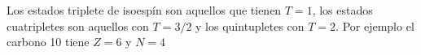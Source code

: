     Los estados triplete de isoespín son aquellos que tienen $T=1$, los estados cuatripletes son aquellos con $T=3/2$ y los quintupletes con $T=2$. Por ejemplo el carbono 10 tiene $Z=6$ y $N=4$
